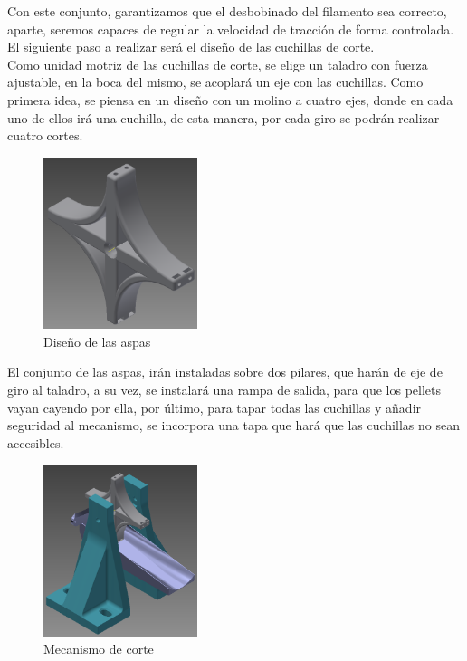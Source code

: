 Con este conjunto, garantizamos que el desbobinado del filamento sea correcto, aparte, seremos capaces de regular la velocidad de tracción de forma controlada. El siguiente paso a realizar será el diseño de las cuchillas de corte.\\

Como unidad motriz de las cuchillas de corte, se elige un taladro con fuerza ajustable, en la boca del mismo, se acoplará un eje con las cuchillas. Como primera idea, se piensa en un diseño con un molino a cuatro ejes, donde en cada uno de ellos irá una cuchilla, de esta manera, por cada giro se podrán realizar cuatro cortes.

    \begin{figure}[H]
            \centering
            \includegraphics[width=0.4\textwidth]{images/peletizadora/aspas.png}
            \caption{Diseño de las aspas}
            \label{fig:peletizadora_aspas}
    \end{figure}

El conjunto de las aspas, irán instaladas sobre dos pilares, que harán de eje de giro al taladro, a su vez, se instalará una rampa de salida, para que los pellets vayan cayendo por ella, por último, para tapar todas las cuchillas y añadir seguridad al mecanismo, se incorpora una tapa que hará que las cuchillas no sean accesibles.


    \begin{figure}[H]
            \centering
            \includegraphics[width=0.4\textwidth]{images/peletizadora/corte.png}
            \caption{Mecanismo de corte}
            \label{fig:peletizadora_corte}
    \end{figure}

